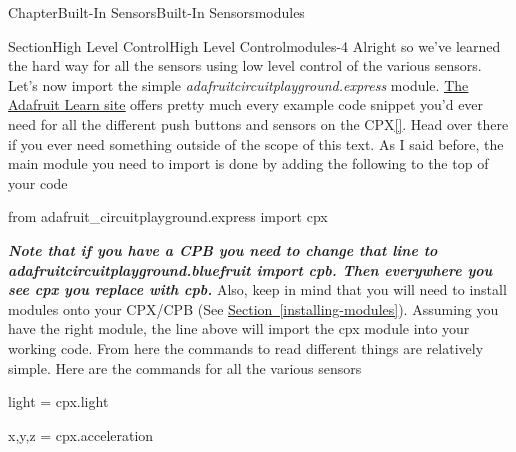 \documentclass[oneside,10pt,]{book}
\newcommand{\xreffont}{\relax}
\newcommand{\linkhilite}[1]{\underline{#1}}
\newcommand{\alert}[1]{\textbf{\textit{#1}}}
\numberwithin{equation}{section}
\begin{document}
\begin{chapterptx}{Chapter}{Built-In Sensors}{}{Built-In Sensors}{}{}{modules}
\typeout{************************************************}
%
\begin{sectionptx}{Section}{High Level Control}{}{High Level Control}{}{}{modules-4}
Alright so we've learned the hard way for all the sensors using low level control of the various sensors. Let's now import the simple \emph{adafruit\textunderscore{}circuitplayground.express} module. \href{https://learn.adafruit.com/circuitpython-made-easy-on-circuit-playground-express/circuit-playground-express-library}{\linkhilite{The Adafruit Learn site}} offers pretty much every example code snippet you'd ever need for all the different push buttons and sensors on the CPX\hyperlink{Adafruit}{\linkhilite{[{\xreffont 32}]}}. Head over there if you ever need something outside of the scope of this text. As I said before, the main module you need to import is done by adding the following to the top of your code%
\begin{preformatted}
from adafruit_circuitplayground.express import cpx
\end{preformatted}
\alert{Note that if you have a CPB you need to change that line to adafruit\textunderscore{}circuitplayground.bluefruit import cpb. Then everywhere you see cpx you replace with cpb.} Also, keep in mind that you will need to install modules onto your CPX\slash{}CPB (See \hyperref[installing-modules]{\linkhilite{Section~{\xreffont\ref{installing-modules}}}}). Assuming you have the right module, the line above will import the cpx module into your working code. From here the commands to read different things are relatively simple. Here are the commands for all the various sensors%
\begin{preformatted}
light = cpx.light

x,y,z = cpx.acceleration


\end{preformatted}
\end{sectionptx}
\end{chapterptx}
\end{document}
